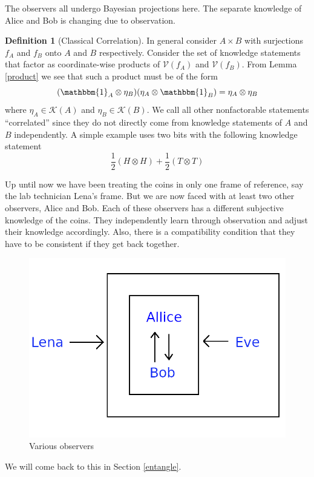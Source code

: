 \documentclass[12pt,a4paper]{article}
\theoremstyle{myrule}
\theoremstyle{postulate}
\theoremstyle{definition}
\newtheorem{definition}{Definition}[section]
\begin{document}
The observers all undergo Bayesian projections here. The separate knowledge of Alice and Bob is changing due to observation.

\begin{definition}[Classical Correlation]
\label{corrdef}
In general consider $A \times B$ with surjections $f_A$ and $f_B$ onto $A$ and $B$ respectively.  Consider the set of knowledge statements that factor as coordinate-wise products of $\mathcal{V}(f_A)$ and $\mathcal{V}(f_B)$.  From Lemma \ref{product} we see that such a product must be of the form
\[
(\mathbbm{1}_A \otimes \eta_B) (\eta_A \otimes \mathbbm{1}_B) = \eta_A \otimes \eta_B
\]
where $\eta_A \in \mathcal{K}(A)$ and $\eta_B \in \mathcal{K}(B)$.  We call all other nonfactorable statements ``correlated'' since they do not directly come from knowledge statements of $A$ and $B$ independently.  A simple example uses two bits with the following knowledge statement
\begin{equation}
\label{classiccorr}
  \frac{1}{2} (H \otimes H) + \frac{1}{2} (T \otimes T) 
\end{equation}

\end{definition}

Up until now we have been treating the coins in only one frame of reference, say the lab technician Lena's frame.  But we are now faced with at least two other observers, Alice and Bob.  Each of these observers has a different subjective knowledge of the coins.  They independently learn through observation and adjust their knowledge accordingly.  Also, there is a compatibility condition that they have to be consistent if they get back together.


\begin{figure}[h]
\centering
\includegraphics[scale=1.0]{allice_and_bob.png}
\caption{Various observers}
\label{anb}
\end{figure}
We will come back to this in Section \ref{entangle}.
\end{document}
